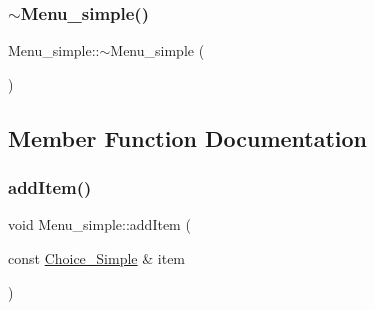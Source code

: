 \mbox{\label{class_menu__simple_a82cb459eae7f0c28d2576ead6430fe52}} 
\subsubsection{\texorpdfstring{$\sim$\+Menu\+\_\+simple()}{~Menu\_simple()}}
{\footnotesize\ttfamily Menu\+\_\+simple\+::$\sim$\+Menu\+\_\+simple (\begin{DoxyParamCaption}{ }\end{DoxyParamCaption})\hspace{0.3cm}{\ttfamily [virtual]}}



\subsection{Member Function Documentation}
\mbox{\label{class_menu__simple_a0fc5b4ec10c844f34495364f70cd333e}} 
\subsubsection{\texorpdfstring{add\+Item()}{addItem()}}
{\footnotesize\ttfamily void Menu\+\_\+simple\+::add\+Item (\begin{DoxyParamCaption}\item[{const \hyperlink{class_choice___simple}{Choice\+\_\+\+Simple} \&}]{item }\end{DoxyParamCaption})\hspace{0.3cm}{\ttfamily [virtual]}}

